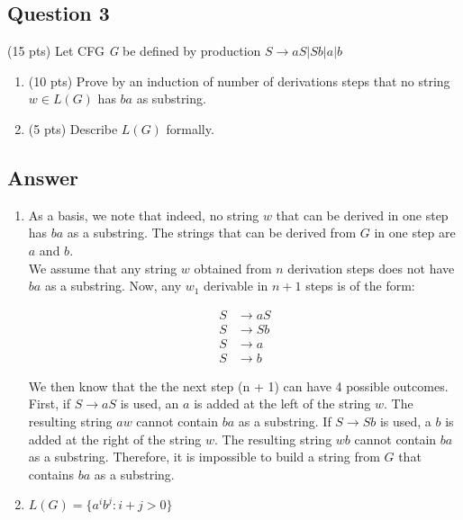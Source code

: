 \newpage
\subsection*{Question 3}

\noindent (15 pts) Let CFG \textit{G} be defined by production $S \rightarrow aS | Sb | a | b  $
    
    \begin{enumerate}[label={(\alph*)}]
        \item (10 pts) Prove by an induction of number of derivations steps that no string $w \in L(G)$ has $ba$ as substring.
        \item (5 pts) Describe $L(G)$ formally. 
    \end{enumerate}


\subsection*{Answer}

\begin{enumerate}[label={(\alph*)}]
    \item As a basis, we note that indeed, no string $w$ that can be derived in one step has $ba$ as a substring. The strings that can be derived from $G$ in one step are $a$ and $b$.  \\
    We assume that any string $w$ obtained from $n$ derivation steps does not have $ba$ as a substring. Now, any $w_1$ derivable in $n+1$ steps is of the form:
    
    \begin{align*}
        S &\rightarrow aS\\
        S &\rightarrow Sb\\
        S &\rightarrow a\\
        S &\rightarrow b
    \end{align*}
    
    We then know that the the next step (n + 1) can have 4 possible outcomes. First, if $S \rightarrow aS$ is used, an $a$ is added at the left of the string $w$. The resulting string $aw$ cannot contain $ba$ as a substring. If $ S \rightarrow Sb$ is used, a $b$ is added at the right of the string $w$. The resulting string $wb$ cannot contain $ba$ as a substring. Therefore, it is impossible to build a string from $G$ that contains $ba$ as a substring. 
    \item $L(G) = \{a^ib^j : i+j > 0\}$
    
\end{enumerate}